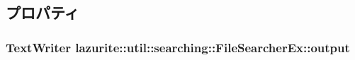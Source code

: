 \subsection{プロパティ}
\hypertarget{classlazurite_1_1util_1_1searching_1_1_file_searcher_ex_a49a377117740ac0734a57f1b13a44493}{
\subsubsection[{output}]{\setlength{\rightskip}{0pt plus 5cm}TextWriter lazurite::util::searching::FileSearcherEx::output}}
\label{classlazurite_1_1util_1_1searching_1_1_file_searcher_ex_a49a377117740ac0734a57f1b13a44493}


